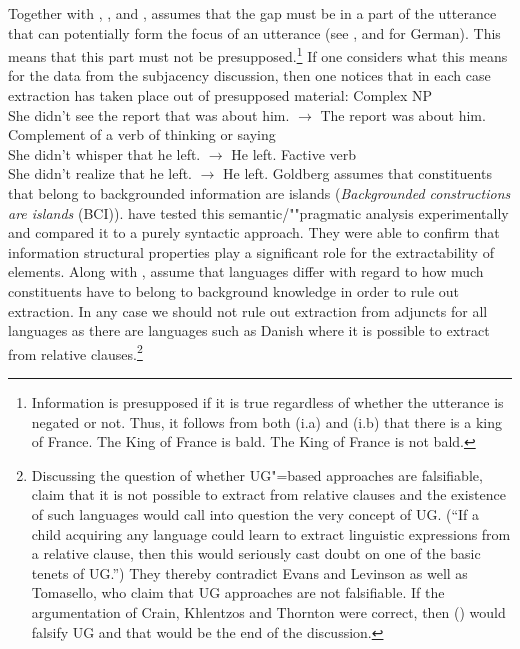 \noindent
Together with \citet{Erteschik81a}, \citet{EL79a}, \citet{Takami88a}
and \citet{vanValin98a}, \citet[Section~7.2]{Goldberg2006a} assumes that the gap must be in a part of the utterance
that can potentially form the focus of an utterance (see ,  and
 for German). This means that this part must not be presupposed.\footnote{  
  Information is presupposed if it is true regardless of whether the utterance is negated or not.
  Thus, it follows from both (i.a) and (i.b) that there is a king of France.
  \eal
  \ex The King of France is bald.
  \ex The King of France is not bald.
  \zllast
}
If one considers what this means for the data from the subjacency discussion, then one notices that in each case extraction
has taken place out of presupposed material:
\eal
\ex Complex NP\\
She didn't see the report that was about him. $\to$ The report was about him.
\ex Complement of a verb of thinking or saying\\
She didn't whisper that he left. $\to$ He left.
\ex Factive verb\\
She didn't realize that he left. $\to$ He left.
\zl
Goldberg assumes that constituents that belong to backgrounded information are islands (\emph{Backgrounded constructions are islands} (BCI)).
\citet{AG2008a} have tested this semantic/""pragmatic analysis experimentally and compared it to a purely syntactic approach.
They were able to confirm that information structural properties play a significant role for the extractability
of elements. Along with \citet[Section~3.H]{Erteschik73a-u}, \citet[]{AG2008a} assume that languages differ with regard to how
much constituents have to belong to background knowledge in order to rule out extraction.
In any case we should not rule out extraction from adjuncts for all languages as there are languages such as Danish where it is possible to
extract from relative clauses.\footnote{
Discussing the question of whether UG"=based approaches are falsifiable, \citet*[]{CKT2010a} claim that it is not possible to extract from relative clauses and the existence
of such languages would call into question the very concept of UG. (``If a child acquiring any language
could learn to extract linguistic expressions from a relative clause, then this would seriously
cast doubt on one of the basic tenets of UG.'') They thereby contradict Evans and Levinson as well as Tomasello, who claim that UG approaches are
not falsifiable. If the argumentation of Crain, Khlentzos and Thornton were correct, then () would falsify
UG and that would be the end of the discussion.
}
